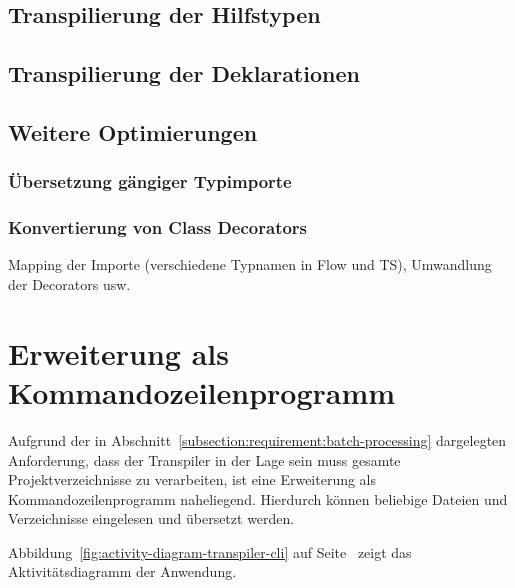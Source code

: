   \subsection{Transpilierung der Hilfstypen}
  \subsection{Transpilierung der Deklarationen}

  \subsection{Weitere Optimierungen}
    \subsubsection{Übersetzung gängiger Typimporte}
    \subsubsection{Konvertierung von Class Decorators}

  Mapping der Importe (verschiedene Typnamen in Flow und TS), Umwandlung der Decorators usw.

\section{Erweiterung als Kommandozeilenprogramm}

Aufgrund der in Abschnitt~\ref{subsection:requirement:batch-processing} dargelegten Anforderung, dass der Transpiler in der Lage sein muss gesamte Projektverzeichnisse zu verarbeiten, ist eine Erweiterung als Kommandozeilenprogramm naheliegend. Hierdurch können beliebige Dateien und Verzeichnisse eingelesen und übersetzt werden.


Abbildung~\ref{fig:activity-diagram-transpiler-cli} auf Seite~\pageref{fig:activity-diagram-transpiler-cli} zeigt das Aktivitätsdiagramm der Anwendung.

